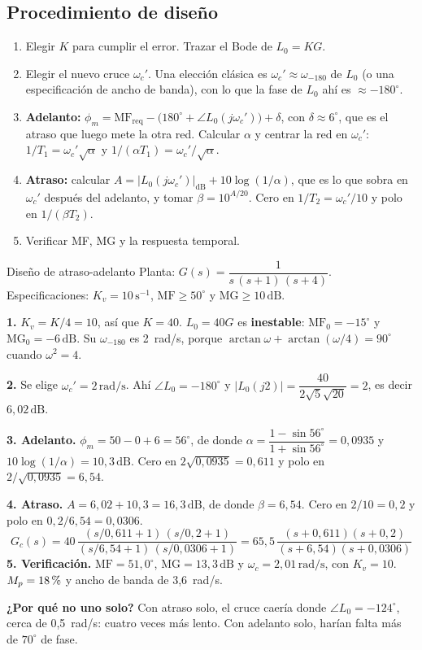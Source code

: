 \documentclass[11pt,a4paper]{article}
\newcounter{ejemplo}
\newenvironment{ejemplo}[1]{\refstepcounter{ejemplo}\begin{ejemplobox}{#1}}{\end{ejemplobox}}
\newcommand{\pct}{\ensuremath{\,\mathchar"7025}}
\newcommand{\dB}{\,\mathrm{dB}}
\newcommand{\rads}{\,\mathrm{rad/s}}
\newcommand{\MF}{\mathrm{MF}}
\newcommand{\MG}{\mathrm{MG}}
\newcommand{\wc}{\omega_c}
\newcommand{\wf}{\omega_{-180}}
\begin{document}
\subsection{Procedimiento de diseño}
\begin{receta}
\begin{enumerate}[label=\textbf{\arabic*.}]
\item Elegir $K$ para cumplir el error. Trazar el Bode de $L_0=KG$.
\item Elegir el nuevo cruce $\wc'$. Una elección clásica es $\wc'\approx\wf$ de $L_0$ (o una especificación de ancho de banda),
      con lo que la fase de $L_0$ ahí es $\approx-180^\circ$.
\item \textbf{Adelanto:} $\phi_m=\MF_{\text{req}}-\big(180^\circ+\angle L_0(j\wc')\big)+\delta$, con $\delta\approx6^\circ$, que es el atraso que
      luego mete la otra red. Calcular $\alpha$ y centrar la red en $\wc'$: $1/T_1=\wc'\sqrt\alpha$ y $1/(\alpha T_1)=\wc'/\sqrt\alpha$.
\item \textbf{Atraso:} calcular $A=|L_0(j\wc')|_{\mathrm{dB}}+10\log(1/\alpha)$, que es lo que sobra en $\wc'$ después del adelanto,
      y tomar $\beta=10^{A/20}$. Cero en $1/T_2=\wc'/10$ y polo en $1/(\beta T_2)$.
\item Verificar MF, MG y la respuesta temporal.
\end{enumerate}
\end{receta}

\begin{ejemplo}{Diseño de atraso-adelanto}
\label{ej:laglead}
Planta: $G(s)=\dfrac{1}{s\,(s+1)\,(s+4)}$. Especificaciones: $K_v=10\,\mathrm{s^{-1}}$, $\MF\ge50^\circ$ y $\MG\ge10\dB$.

\textbf{1.} $K_v=K/4=10$, así que $K=40$. $L_0=40G$ es \textbf{inestable}: $\MF_0=-15^\circ$ y $\MG_0=-6\dB$. Su $\wf$ es 2~rad/s,
porque $\arctan\omega+\arctan(\omega/4)=90^\circ$ cuando $\omega^2=4$.

\textbf{2.} Se elige $\wc'=2\rads$. Ahí $\angle L_0=-180^\circ$ y $|L_0(j2)|=\dfrac{40}{2\sqrt5\sqrt{20}}=2$, es decir $6{,}02\dB$.

\textbf{3. Adelanto.} $\phi_m=50-0+6=56^\circ$, de donde $\alpha=\dfrac{1-\sin56^\circ}{1+\sin56^\circ}=0{,}0935$ y $10\log(1/\alpha)=10{,}3\dB$.
Cero en $2\sqrt{0{,}0935}=0{,}611$ y polo en $2/\sqrt{0{,}0935}=6{,}54$.

\textbf{4. Atraso.} $A=6{,}02+10{,}3=16{,}3\dB$, de donde $\beta=6{,}54$. Cero en $2/10=0{,}2$ y polo en $0{,}2/6{,}54=0{,}0306$.
\[
\boxed{G_c(s)=40\,\frac{(s/0{,}611+1)\,(s/0{,}2+1)}{(s/6{,}54+1)\,(s/0{,}0306+1)}=65{,}5\,\frac{(s+0{,}611)(s+0{,}2)}{(s+6{,}54)(s+0{,}0306)}}
\]
\textbf{5. Verificación.} $\MF=51{,}0^\circ$, $\MG=13{,}3\dB$ y $\wc=2{,}01\rads$, con $K_v=10$. $M_p=18\pct{}$ y ancho de banda de 3,6~rad/s. \checkmark

\textbf{¿Por qué no uno solo?} Con atraso solo, el cruce caería donde $\angle L_0=-124^\circ$, cerca de 0,5~rad/s: cuatro veces más lento.
Con adelanto solo, harían falta más de $70^\circ$ de fase.
\end{ejemplo}
\end{document}
